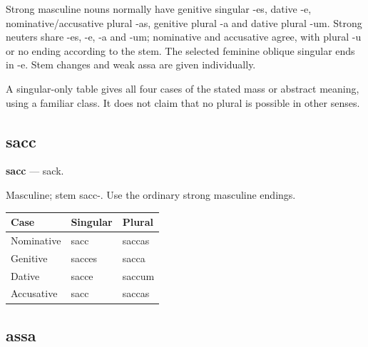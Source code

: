 Strong masculine nouns normally have genitive singular -es, dative -e, nominative/\allowbreak{}accusative plural -as, genitive plural -a and dative plural -um. Strong neuters share -es, -e, -a and -um; nominative and accusative agree, with plural -u or no ending according to the stem. The selected feminine oblique singular ends in -e. Stem changes and weak assa are given individually.

A singular-only table gives all four cases of the stated mass or abstract meaning, using a familiar class. It does not claim that no plural is possible in other senses.

\subsection*{sacc}

\par\begin{minipage}{\linewidth}\raggedright
\textbf{sacc} — sack.

Masculine; stem sacc-. Use the ordinary strong masculine endings.

\par\begingroup
\fontsize{10.5}{13.2}\selectfont
\setlength{\LTleft}{0pt}\setlength{\LTright}{\fill}
\noindent
\begin{tabular}{@{}>{\raggedright\arraybackslash}p{39.46mm}>{\raggedright\arraybackslash}p{39.46mm}>{\raggedright\arraybackslash}p{39.46mm}@{}}
\toprule
\textbf{Case} & \textbf{Singular} & \textbf{Plural} \\
\midrule
Nominative & sacc & saccas \\
Genitive & sacces & sacca \\
Dative & sacce & saccum \\
Accusative & sacc & saccas \\
\bottomrule
\end{tabular}
\par\endgroup

\end{minipage}\par
{}
\subsection*{assa}

